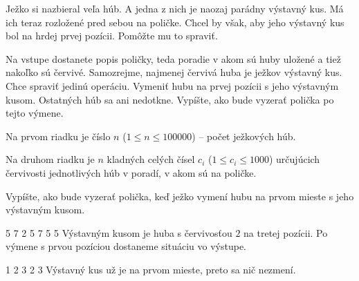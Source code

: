 




Ježko si nazbieral veľa húb. A jedna z nich je naozaj parádny výstavný kus. Má ich teraz rozložené
pred sebou na poličke. Chcel by však, aby jeho výstavný kus bol na hrdej prvej pozícii. Pomôžte mu
to spraviť.


Na vstupe dostanete popis poličky, teda poradie v akom sú huby uložené a tiež nakoľko sú červivé.
Samozrejme, najmenej červivá huba je ježkov výstavný kus. Chce spraviť jedinú operáciu. Vymeniť hubu
na prvej pozícii s jeho výstavným kusom. Ostatných húb sa ani nedotkne. Vypíšte, ako bude vyzerať
polička po tejto výmene.


Na prvom riadku je číslo $n$ ($1 \leq n \leq 100000$) -- počet ježkových húb.

Na druhom riadku je $n$ kladných celých čísel $c_i$ ($1 \leq c_i \leq 1000$) určujúcich červivosti
jednotlivých húb v poradí, v akom sú na poličke.


Vypíšte, ako bude vyzerať polička, keď ježko vymení hubu na prvom mieste s jeho výstavným kusom.


5 7 2 5
 7 5 5
\komentar
Výstavným kusom je huba s červivosťou $2$ na tretej pozícii. Po výmene s prvou pozíciou dostaneme
situáciu vo výstupe.
\koniec

1 2 3
 2 3
\komentar
Výstavný kus už je na prvom mieste, preto sa nič nezmení.
\koniec


